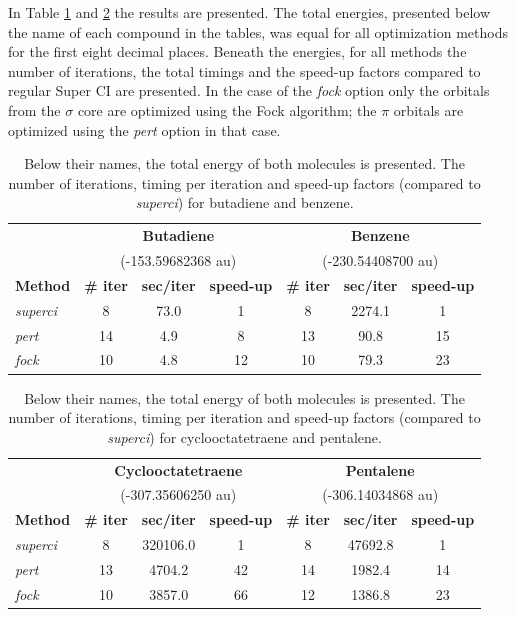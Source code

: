 In Table \ref{ch2.tab.flat1} and \ref{ch2.tab.flat2} the results are presented. The total energies, presented below the name of each compound in the tables, was equal for all optimization methods for the first eight decimal places. Beneath the energies, for all methods the number of iterations, the total timings and the speed-up factors compared to regular Super CI are presented. In the case of the \textit{fock} option only the orbitals from the $\sigma$ core are optimized using the Fock algorithm; the $\pi$ orbitals are optimized using the \textit{pert} option in that case.

\begin{table}[htbp]
\caption{Below their names, the total energy of both molecules is presented. The number of iterations, timing per iteration and speed-up factors (compared to \textit{superci}) for butadiene and benzene.}
\begin{center}
\begin{tabular}{l c c c c c c}
\hline
&\multicolumn{3}{c}{\textbf{Butadiene}}&\multicolumn{3}{c}{\textbf{Benzene}}\\
&\multicolumn{3}{c}{(-153.59682368 au)}&\multicolumn{3}{c}{(-230.54408700 au)}\\
\textbf{Method}&\textbf{\# iter}&\textbf{sec/iter}&\textbf{speed-up}&\textbf{\# iter}&\textbf{sec/iter}&\textbf{speed-up}\\
\hline
\textit{superci}&8&73.0&1&8&2274.1&1\\
\textit{pert}&14&4.9&8&13&90.8&15\\
\textit{fock}&10&4.8&12&10&79.3&23\\
\end{tabular}
\label{ch2.tab.flat1}
\end{center}
\end{table}

\begin{table}[htbp]
\caption{Below their names, the total energy of both molecules is presented. The number of iterations, timing per iteration and speed-up factors (compared to \textit{superci}) for cyclooctatetraene and pentalene.}
\begin{center}
\begin{tabular}{l c c c c c c}
\hline
&\multicolumn{3}{c}{\textbf{Cyclooctatetraene}}&\multicolumn{3}{c}{\textbf{Pentalene}}\\
&\multicolumn{3}{c}{(-307.35606250 au)}&\multicolumn{3}{c}{(-306.14034868 au)}\\
\textbf{Method}&\textbf{\# iter}&\textbf{sec/iter}&\textbf{speed-up}&\textbf{\# iter}&\textbf{sec/iter}&\textbf{speed-up}\\
\hline
\textit{superci}&8&320106.0&1&8&47692.8&1\\
\textit{pert}&13&4704.2&42&14&1982.4&14\\
\textit{fock}&10&3857.0&66&12&1386.8&23\\
\end{tabular}
\label{ch2.tab.flat2}
\end{center}
\end{table}

